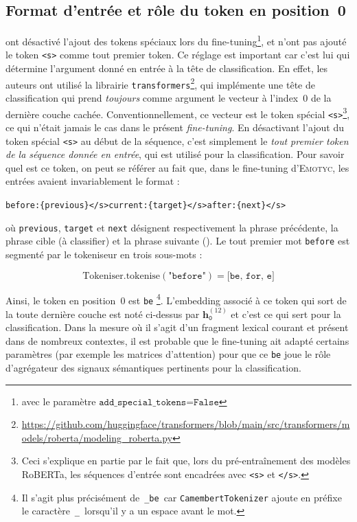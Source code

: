\documentclass[french, 11pt]{article}
\begin{document}
\subsection*{Format d'entrée et rôle du token en position~0}
\label{subsec:format-entree}

\textcite{etienne2024} ont désactivé l'ajout des tokens spéciaux lors du fine-tuning\footnote{avec le paramètre $\texttt{add\_special\_tokens=False}$}, et n'ont pas ajouté le token \texttt{<s>} comme tout premier token. Ce réglage est important car c'est lui qui détermine l'argument donné en entrée à la tête de classification. En effet, les auteurs ont utilisé la librairie \texttt{transformers}\footnote{\url{https://github.com/huggingface/transformers/blob/main/src/transformers/models/roberta/modeling_roberta.py}}, qui implémente une tête de classification qui prend \textit{toujours} comme argument le vecteur à l'index~0 de la dernière couche cachée. Conventionnellement, ce vecteur est le token spécial \texttt{<s>}\footnote{Ceci s'explique en partie par le fait que, lors du pré-entraînement des modèles RoBERTa, les séquences d'entrée sont encadrées avec \texttt{<s>} et \texttt{</s>}.}, ce qui n'était jamais le cas dans le présent \textit{fine-tuning}. En désactivant l'ajout du token spécial \texttt{<s>} au début de la séquence, c'est simplement le \textit{tout premier token de la séquence donnée en entrée}, qui est utilisé pour la classification. Pour savoir quel est ce token, on peut se référer au fait que, dans le fine-tuning d'\textsc{Emotyc}, les entrées avaient invariablement le format :
\begin{center}
\texttt{before:\{previous\}</s>current:\{target\}</s>after:\{next\}</s>}
\end{center}
où \texttt{{previous}}, \texttt{{target}} et \texttt{{next}} désignent respectivement la phrase précédente, la phrase cible (à classifier) et la phrase suivante (\cite[p.\,5]{etienne2024}). Le tout premier mot \og \texttt{before} \fg est segmenté par le tokeniseur en trois sous-mots :

$$\text{Tokeniser.tokenise}(\texttt{"before"}) = \bigl[\texttt{be},\, \texttt{for},\, \texttt{e}\bigr]$$

Ainsi, le token en position~0 est \og \texttt{be}  \fg  \footnote{Il s'agit plus précisément de \og\,\texttt{\_be}\,\fg{} car \texttt{CamembertTokenizer} ajoute en préfixe le caractère \og\,\texttt{\_}\,\fg{} lorsqu'il y a un espace avant le mot.}. L'embedding associé à ce token qui sort de la toute dernière couche est noté ci-dessus par $\mathbf{h}_{\texttt{0}}^{(12)}$ et c'est ce qui sert pour la classification. Dans la mesure où il s'agit d'un fragment lexical courant et présent dans de nombreux contextes, il est probable que le fine-tuning ait adapté certains paramètres (par exemple les matrices d'attention) pour que ce \og \texttt{be} \fg{} joue le rôle d'agrégateur des signaux sémantiques pertinents pour la classification.
\end{document}
